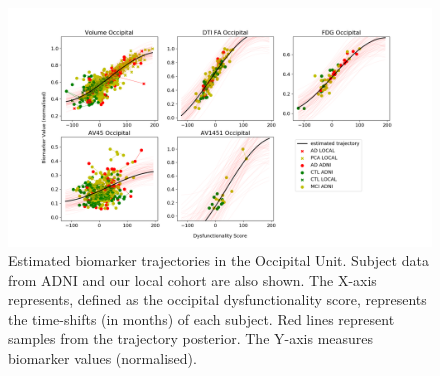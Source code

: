 \documentclass{llncs}
\begin{document}
\begin{figure}
\includegraphics[width=\textwidth, trim=90 0 110 0, clip]{figures/unit1_allTraj_tad-drcTinyPen1_JMD.png} 
\caption{Estimated biomarker trajectories in the Occipital Unit. Subject data from ADNI and our local cohort are also shown. The X-axis represents, defined as the occipital dysfunctionality score, represents the time-shifts (in months) of each subject. Red lines represent samples from the trajectory posterior. The Y-axis measures biomarker values (normalised).}
\label{fig:occipUnit}
\end{figure}
\end{document}
